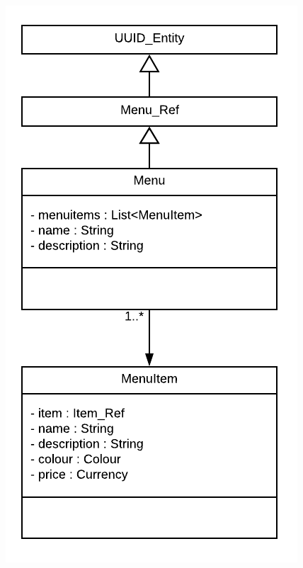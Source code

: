 	\begin{minipage}[t][][b]{.3\linewidth}
		\includegraphics[width=\linewidth]{images/data_model/menu.png}
	\end{minipage}

\pagebreak

